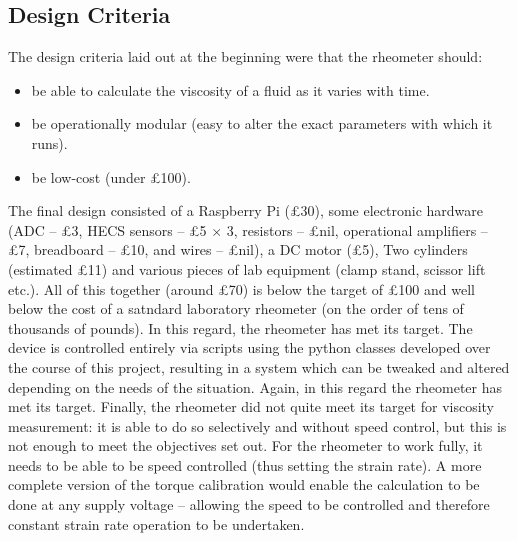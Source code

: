 \documentclass[twoside,a4]{report}
\begin{document}
	\subsection*{Design Criteria}
	The design criteria laid out at the beginning were that the rheometer should:
	\begin{itemize}
		\item be able to calculate the viscosity of a fluid as it varies with time.
		\item be operationally modular (easy to alter the exact parameters with which it runs).
		\item be low-cost (under \pounds 100).
	\end{itemize}
	The final design consisted of a Raspberry Pi (\pounds 30), some electronic hardware (ADC -- \pounds 3, HECS sensors -- \pounds 5 $\times$ 3, resistors -- \pounds nil, operational amplifiers -- \pounds 7, breadboard -- \pounds 10, and wires -- \pounds nil), a DC motor (\pounds 5), Two cylinders (estimated \pounds 11) and various pieces of lab equipment (clamp stand, scissor lift etc.). All of this together (around \pounds 70) is below the target of \pounds 100 and well below the cost of a satndard laboratory rheometer (on the order of tens of thousands of pounds). In this regard, the rheometer has met its target.
	The device is controlled entirely via scripts using the python classes developed over the course of this project, resulting in a system which can be tweaked and altered depending on the needs of the situation. Again, in this regard the rheometer has met its target.
	Finally, the rheometer did not quite meet its target for viscosity measurement: it is able to do so selectively and without speed control, but this is not enough to meet the objectives set out. For the rheometer to work fully, it needs to be able to be speed controlled (thus setting the strain rate). A more complete version of the torque calibration would enable the calculation to be done at any supply voltage -- allowing the speed to be controlled and therefore constant strain rate operation to be undertaken.
	
\end{document}

